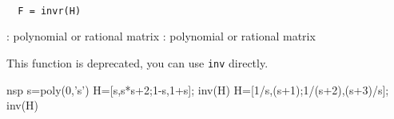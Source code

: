 
\begin{mandesc}
   \\ %
\end{mandesc}
\begin{calling_sequence}
\begin{verbatim}
  F = invr(H)  
\end{verbatim}
\end{calling_sequence}
\begin{parameters}
  \begin{varlist}
    : polynomial or rational matrix
    : polynomial or rational matrix
  \end{varlist}
\end{parameters}
\begin{mandescription}
  This function is deprecated, you can use \verb!inv! directly.
\end{mandescription}
\begin{examples}
  \begin{mintednsp}{nsp}
    s=poly(0,'s')
    H=[s,s*s+2;1-s,1+s]; 
    inv(H)
    H=[1/s,(s+1);1/(s+2),(s+3)/s];
    inv(H)
  \end{mintednsp}
\end{examples}
\begin{manseealso}
      
\end{manseealso}

